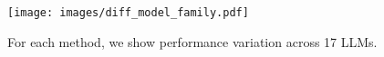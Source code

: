 \begin{figure}[t]
    \centering
    \texttt{[image: images/diff\_model\_family.pdf]}
    \caption{
    For each method, we show performance variation across 17 LLMs.
    }
    \label{fig:eval_model_family}
\end{figure}
